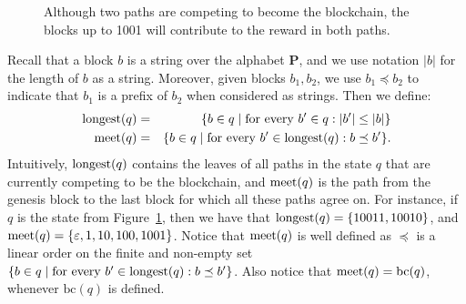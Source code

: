 \documentclass[a4paper,english,cleveref, autoref,numberwithinsect]{lipics-v2019}
\newcommand{\bchain}{\text{bc}}
\newcommand{\bP}{\mathbf{P}}
\newcommand{\longest}{{\text{\rm longest}}}
\newcommand{\meet}{\text{\rm meet}}
\begin{document}
\begin{figure}
\centering
{} 
\vspace*{-15pt}
\caption{Although two paths are competing to become the blockchain, the blocks up to 1001 will contribute to the reward in both paths. \label{fig-simple-fork}}
\end{figure}

Recall that a block $b$ is a string over the alphabet $\bP$, and we use notation $|b|$ for the length of $b$ as a string. Moreover, given blocks $b_1, b_2$, we use %
$b_1 \preceq b_2$ to indicate that $b_1$ is a prefix of $b_2$ when considered as strings. Then we define: 
\begin{eqnarray*}
\longest(q) & = & \{ b \in q \mid \text{for every } b' \in q: |b'| \leq |b|\}\\
\meet(q) & = & \{b \in q \mid \text{for every } b' \in \longest(q): b \preceq b'\}.
\end{eqnarray*}
Intuitively, $\longest(q)$ contains the leaves of all paths in the state $q$ that are currently competing to be the blockchain, and $\meet(q)$ is the path from the genesis block to the last block for which all these paths agree on. For instance, if $q$ is the state from Figure~\ref{fig-simple-fork}, then we have that $\longest(q)=\{10011,10010\}$, and $\meet(q)=\{\varepsilon, 1, 10, 100, 1001\}$. Notice that $\meet(q)$ is well defined as $\preceq$ is a linear order on the finite and non-empty set $\{b \in q \mid \text{for every } b' \in \longest(q): b \preceq b'\}$. Also notice that $\meet(q)=\bchain(q)$, whenever $\bchain(q)$ is defined.
\end{document}
